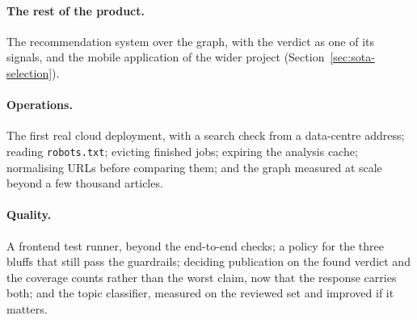 \paragraph{The rest of the product.} The recommendation system over the
graph, with the verdict as one of its signals, and the mobile
application of the wider project (Section~\ref{sec:sota-selection}).

\paragraph{Operations.} The first real cloud deployment, with a search
check from a data-centre address; reading \texttt{robots.txt}; evicting
finished jobs; expiring the analysis cache; normalising URLs before
comparing them; and the graph measured at scale beyond a few thousand
articles.

\paragraph{Quality.} A frontend test runner, beyond the end-to-end
checks; a policy for the three bluffs
that still pass the guardrails; deciding publication on the found
verdict and the coverage counts rather than the worst claim, now that
the response carries both; and the topic classifier, measured on the
reviewed set and improved if it matters.
